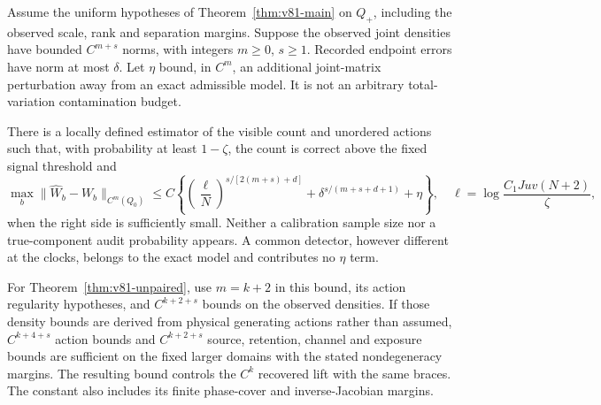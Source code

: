 \begin{theorem}
\label{thm:v81-sampling}
Assume the uniform hypotheses of Theorem~\ref{thm:v81-main} on $Q_+$,
including the observed scale, rank and separation margins.  Suppose
the observed joint densities have bounded $C^{m+s}$ norms, with
integers $m\ge0$, $s\ge1$.  Recorded endpoint errors have norm at most
$\delta$.  Let $\eta$ bound, in $C^m$, an additional joint-matrix
perturbation away from an exact admissible model.  It is not an arbitrary
total-variation contamination budget.

There is a locally defined estimator of the visible count and unordered
actions such that, with probability at least $1-\zeta$, the count is
correct above the fixed signal threshold and
\begin{equation}\label{eq:v81-rate}
 \max_b\|\widehat W_b-W_b\|_{C^m(Q_0)}
 \le C\left\{\left(\frac{\ell}{N}\right)^{s/[2(m+s)+d]}
       +\delta^{s/(m+s+d+1)}+\eta\right\},
 \quad \ell=\log\frac{C_1Juv(N+2)}{\zeta},
\end{equation}
when the right side is sufficiently small.  Neither a calibration
sample size nor a true-component audit probability appears.
A common detector, however different at the clocks, belongs to the
exact model and contributes no $\eta$ term.

For Theorem~\ref{thm:v81-unpaired}, use $m=k+2$ in this bound, its
action regularity hypotheses, and $C^{k+2+s}$ bounds on the observed
densities.  If those density bounds are derived from physical generating
actions rather than assumed, $C^{k+4+s}$ action bounds and
$C^{k+2+s}$ source, retention, channel and exposure bounds are sufficient
on the fixed larger domains with the stated nondegeneracy margins.  The resulting bound
controls the $C^k$ recovered lift with the same braces.  The constant
also includes its finite phase-cover and inverse-Jacobian margins.
\end{theorem}

